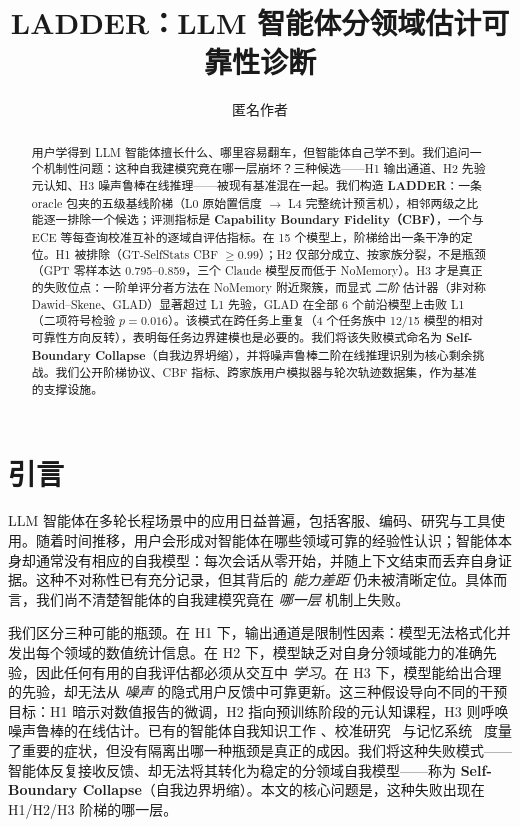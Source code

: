 \documentclass[11pt,a4paper,fontset=fandol]{ctexart}
\title{LADDER：LLM 智能体分领域估计可靠性诊断}
\author{匿名作者}
\date{}
\begin{document}
\maketitle

\begin{abstract}
用户学得到 LLM 智能体擅长什么、哪里容易翻车，但智能体自己学不到。我们追问一个机制性问题：这种自我建模究竟在哪一层崩坏？三种候选——H1 输出通道、H2 先验元认知、H3 噪声鲁棒在线推理——被现有基准混在一起。我们构造 \textbf{LADDER}：一条 oracle 包夹的五级基线阶梯（L0 原始置信度 $\to$ L4 完整统计预言机），相邻两级之比能逐一排除一个候选；评测指标是 \textbf{Capability Boundary Fidelity（CBF）}，一个与 ECE 等每查询校准互补的逐域自评估指标。在 15 个模型上，阶梯给出一条干净的定位。H1 被排除（GT-SelfStats CBF $\geq 0.99$）；H2 仅部分成立、按家族分裂，不是瓶颈（GPT 零样本达 0.795--0.859，三个 Claude 模型反而低于 NoMemory）。H3 才是真正的失败位点：一阶单评分者方法在 NoMemory 附近聚簇，而显式 \emph{二阶} 估计器（非对称 Dawid--Skene、GLAD）显著超过 L1 先验，GLAD 在全部 6 个前沿模型上击败 L1（二项符号检验 $p=0.016$）。该模式在跨任务上重复（4 个任务族中 12/15 模型的相对可靠性方向反转），表明每任务边界建模也是必要的。我们将该失败模式命名为 \textbf{Self-Boundary Collapse}（自我边界坍缩），并将噪声鲁棒二阶在线推理识别为核心剩余挑战。我们公开阶梯协议、CBF 指标、跨家族用户模拟器与轮次轨迹数据集，作为基准的支撑设施。
\end{abstract}

\section{引言}
\label{sec:intro}



LLM 智能体在多轮长程场景中的应用日益普遍，包括客服、编码、研究与工具使用。随着时间推移，用户会形成对智能体在哪些领域可靠的经验性认识；智能体本身却通常没有相应的自我模型：每次会话从零开始，并随上下文结束而丢弃自身证据。这种不对称性已有充分记录，但其背后的 \emph{能力差距} 仍未被清晰定位。具体而言，我们尚不清楚智能体的自我建模究竟在 \emph{哪一层} 机制上失败。

我们区分三种可能的瓶颈。在 H1 下，输出通道是限制性因素：模型无法格式化并发出每个领域的数值统计信息。在 H2 下，模型缺乏对自身分领域能力的准确先验，因此任何有用的自我评估都必须从交互中 \emph{学习}。在 H3 下，模型能给出合理的先验，却无法从 \emph{噪声} 的隐式用户反馈中可靠更新。这三种假设导向不同的干预目标：H1 暗示对数值报告的微调，H2 指向预训练阶段的元认知课程，H3 则呼唤噪声鲁棒的在线估计。已有的智能体自我知识工作 \citep{barkan2026capable, hu2026memoryagent}、校准研究~\citep{kadavath2022language, guo2017calibration, xiong2024can} 与记忆系统~\citep{packer2023memgpt, mem02025, tan2025rmm, xu2025amem, li2025memos} 度量了重要的症状，但没有隔离出哪一种瓶颈是真正的成因。我们将这种失败模式——智能体反复接收反馈、却无法将其转化为稳定的分领域自我模型——称为 \textbf{Self-Boundary Collapse}（自我边界坍缩）。本文的核心问题是，这种失败出现在 H1/H2/H3 阶梯的哪一层。
\end{document}
